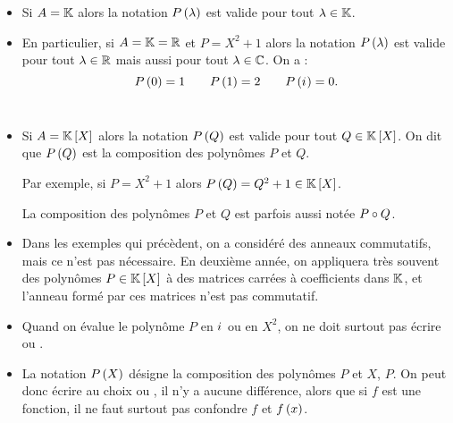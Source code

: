 \begin{ex}
\begin{itemize}
\item Si \(A=\mathbb{K}\) alors la notation \(P\left(\lambda\right)\) est valide pour tout \(\lambda\in\mathbb{K}\). \\

\item En particulier, si \(A=\mathbb{K}=\mathbb{R}\) et \(P=X^2+1\) alors la notation \(P\left(\lambda\right)\) est valide pour tout \(\lambda\in\mathbb{R}\) mais aussi pour tout \(\lambda\in\mathbb{C}\). On a : \[P\left(0\right)=1\qquad P\left(1\right)=2\qquad P\left(i\mkern1mu\right)=0.\] \\

\item Si \(A=\poly\) alors la notation \(P\left(Q\right)\) est valide pour tout \(Q\in\poly\). On dit que \(P\left(Q\right)\) est la composition des polynômes \(P\) et \(Q\).

Par exemple, si \(P=X^2+1\) alors \(P\paren{Q}=Q^2+1\in\poly\).

La composition des polynômes \(P\) et \(Q\) est parfois aussi notée \(P\circ Q\). \\

\item Dans les exemples qui précèdent, on a considéré des anneaux commutatifs, mais ce n'est pas nécessaire. En deuxième année, on appliquera très souvent des polynômes \(P\in\poly\) à des matrices carrées à coefficients dans \(\mathbb{K}\), et l'anneau formé par ces matrices n'est pas commutatif. \\
\end{itemize}
\end{ex}

\begin{rem}[Rédaction]
\begin{itemize}
\item Quand on évalue le polynôme \(P\) en \(i\mkern1mu\) ou en \(X^2\), on ne doit surtout pas écrire  ou . \\

\item La notation \(P\left(X\right)\) désigne la composition des polynômes \(P\) et \(X\), \cad \(P\). On peut donc écrire au choix  ou , il n'y a aucune différence, alors que si \(f\) est une fonction, il ne faut surtout pas confondre \(f\) et \(f\left(x\right)\). \\
\end{itemize}
\end{rem}

